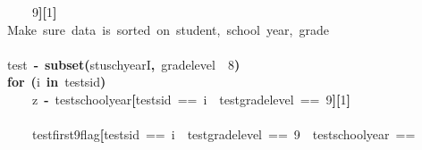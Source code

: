 \documentclass[12pt]{article}
\makeatletter
\newcommand{\hlnumber}[1]{\textcolor[rgb]{0,0,0}{#1}}%
\newcommand{\hlfunctioncall}[1]{\textcolor[rgb]{0.501960784313725,0,0.329411764705882}{\textbf{#1}}}%
\newcommand{\hlkeyword}[1]{\textcolor[rgb]{0,0,0}{\textbf{#1}}}%
\newcommand{\hlcomment}[1]{\textcolor[rgb]{0.180392156862745,0.6,0.341176470588235}{#1}}%
\newcommand{\hlassignement}[1]{\textcolor[rgb]{0,0,0}{\textbf{#1}}}%
\newcommand{\hlsymbol}[1]{\textcolor[rgb]{0,0,0}{#1}}%
\newcommand{\hlstd}[1]{\textcolor[rgb]{0,0,0}{#1}}%
\newenvironment{kframe}{%
 \def\FrameCommand##1{\hskip\@totalleftmargin \hskip-\fboxsep
 \colorbox{shadecolor}{##1}\hskip-\fboxsep
     \hskip-\linewidth \hskip-\@totalleftmargin \hskip\columnwidth}%
 \MakeFramed {\advance\hsize-\width
   \@totalleftmargin\z@ \linewidth\hsize
   \@setminipage}}%
 {\par\unskip\endMakeFramed}
\newenvironment{knitrout}{}{} %
\renewenvironment{knitrout}{\begin{footnotesize}}{\end{footnotesize}}
\makeatother
\begin{document}
\begin{knitrout}
\begin{kframe}
\begin{flushleft}
\hlstd{}{\ }{\ }{\ }{\ }\hlnumber{9}\hlkeyword{]}\hlkeyword{[}\hlnumber{1}\hlkeyword{]}\hspace*{\fill}\\
\hlstd{}\hlcomment{\usebox{\hlnormalsizeboxhash}{\ }Make{\ }sure{\ }data{\ }is{\ }sorted{\ }on{\ }student,{\ }school{\ }year,{\ }grade}\hspace*{\fill}\\
\hlstd{}\hspace*{\fill}\\
\hlstd{}\hlsymbol{test}{\ }\hlassignement{\usebox{\hlnormalsizeboxlessthan}-}{\ }\hlfunctioncall{subset}\hlkeyword{(}\hlsymbol{stuschyearI}\hlkeyword{,}{\ }\hlsymbol{grade\usebox{\hlnormalsizeboxunderscore}level}{\ }\hlkeyword{\usebox{\hlnormalsizeboxgreaterthan}}{\ }\hlnumber{8}\hlkeyword{)}\hspace*{\fill}\\
\hlstd{}\hlkeyword{for}{\ }\hlkeyword{(}\hlsymbol{i}{\ }\hlkeyword{in}{\ }\hlsymbol{test}\hlkeyword{\usebox{\hlnormalsizeboxdollar}}\hlsymbol{sid}\hlkeyword{)}{\ }\hlkeyword{\usebox{\hlnormalsizeboxopenbrace}}\hspace*{\fill}\\
\hlstd{}{\ }{\ }{\ }{\ }\hlsymbol{z}{\ }\hlassignement{\usebox{\hlnormalsizeboxlessthan}-}{\ }\hlsymbol{test}\hlkeyword{\usebox{\hlnormalsizeboxdollar}}\hlsymbol{school\usebox{\hlnormalsizeboxunderscore}year}\hlkeyword{[}\hlsymbol{test}\hlkeyword{\usebox{\hlnormalsizeboxdollar}}\hlsymbol{sid}{\ }=={\ }\hlsymbol{i}{\ }\hlkeyword{\usebox{\hlnormalsizeboxand}}{\ }\hlsymbol{test}\hlkeyword{\usebox{\hlnormalsizeboxdollar}}\hlsymbol{grade\usebox{\hlnormalsizeboxunderscore}level}{\ }=={\ }\hlnumber{9}\hlkeyword{]}\hlkeyword{[}\hlnumber{1}\hlkeyword{]}\hspace*{\fill}\\
\hlstd{}\hspace*{\fill}\\
\hlstd{}{\ }{\ }{\ }{\ }\hlsymbol{test}\hlkeyword{\usebox{\hlnormalsizeboxdollar}}\hlsymbol{first9\usebox{\hlnormalsizeboxunderscore}flag}\hlkeyword{[}\hlsymbol{test}\hlkeyword{\usebox{\hlnormalsizeboxdollar}}\hlsymbol{sid}{\ }=={\ }\hlsymbol{i}{\ }\hlkeyword{\usebox{\hlnormalsizeboxand}}{\ }\hlsymbol{test}\hlkeyword{\usebox{\hlnormalsizeboxdollar}}\hlsymbol{grade\usebox{\hlnormalsizeboxunderscore}level}{\ }=={\ }\hlnumber{9}{\ }\hlkeyword{\usebox{\hlnormalsizeboxand}}{\ }\hlsymbol{test}\hlkeyword{\usebox{\hlnormalsizeboxdollar}}\hlsymbol{school\usebox{\hlnormalsizeboxunderscore}year}{\ }==\hspace*{\fill}\\

\end{flushleft}
\end{kframe}
\end{knitrout}
\end{document}
